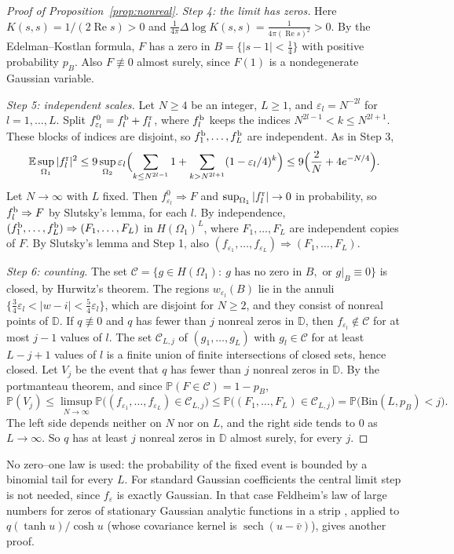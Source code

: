 \documentclass[11pt]{amsart}
\theoremstyle{definition}
\theoremstyle{remark}
\numberwithin{equation}{section}
\newcommand{\D}{\mathbb{D}}
\newcommand{\E}{\mathbb{E}}
\newcommand{\PP}{\mathbb{P}}
\newcommand{\eps}{\varepsilon}
\DeclareMathOperator{\re}{Re}
\DeclareMathOperator{\sech}{sech}
\begin{document}
\begin{proof}[Proof of Proposition~\ref{prop:nonreal}]
\emph{Step 4: the limit has zeros.} Here $K(s,s)=1/(2\re s)>0$ and $\frac1{4\pi}\Delta\log K(s,s)=\frac1{4\pi(\re s)^2}>0$. By the Edelman--Kostlan formula, $F$ has a zero in $B=\{|s-1|<\frac14\}$ with positive probability $p_B$. Also $F\not\equiv0$ almost surely, since $F(1)$ is a nondegenerate Gaussian variable.

\emph{Step 5: independent scales.} Let $N\ge4$ be an integer, $L\ge1$, and $\eps_l=N^{-2l}$ for $l=1,\dots,L$. Split $f^0_{\eps_l}=f^{\rm b}_l+f^{\rm r}_l$, where $f^{\rm b}_l$ keeps the indices $N^{2l-1}<k\le N^{2l+1}$. These blocks of indices are disjoint, so $f^{\rm b}_1,\dots,f^{\rm b}_L$ are independent. As in Step 3,
\[
\E\sup_{\Omega_1}|f^{\rm r}_l|^2\le9\sup_{\Omega_2}\eps_l\Bigl(\sum_{k\le N^{2l-1}}1+\sum_{k>N^{2l+1}}(1-\eps_l/4)^k\Bigr)\le9\Bigl(\frac2N+4e^{-N/4}\Bigr).
\]
Let $N\to\infty$ with $L$ fixed. Then $f^0_{\eps_l}\Rightarrow F$ and $\sup_{\Omega_1}|f^{\rm r}_l|\to0$ in probability, so $f^{\rm b}_l\Rightarrow F$ by Slutsky's lemma, for each $l$. By independence, $(f^{\rm b}_1,\dots,f^{\rm b}_L)\Rightarrow(F_1,\dots,F_L)$ in $H(\Omega_1)^L$, where $F_1,\dots,F_L$ are independent copies of $F$. By Slutsky's lemma and Step 1, also $(f_{\eps_1},\dots,f_{\eps_L})\Rightarrow(F_1,\dots,F_L)$.

\emph{Step 6: counting.} The set $\mathcal C=\{g\in H(\Omega_1):\ g\text{ has no zero in }B,\text{ or }g|_B\equiv0\}$ is closed, by Hurwitz's theorem. The regions $w_{\eps_l}(B)$ lie in the annuli $\{\frac34\eps_l<|w-i|<\frac54\eps_l\}$, which are disjoint for $N\ge2$, and they consist of nonreal points of $\D$. If $q\not\equiv0$ and $q$ has fewer than $j$ nonreal zeros in $\D$, then $f_{\eps_l}\notin\mathcal C$ for at most $j-1$ values of $l$. The set $\mathcal C_{L,j}$ of $(g_1,\dots,g_L)$ with $g_l\in\mathcal C$ for at least $L-j+1$ values of $l$ is a finite union of finite intersections of closed sets, hence closed. Let $V_j$ be the event that $q$ has fewer than $j$ nonreal zeros in $\D$. By the portmanteau theorem, and since $\PP(F\in\mathcal C)=1-p_B$,
\[
\PP(V_j)\le\limsup_{N\to\infty}\PP\bigl((f_{\eps_1},\dots,f_{\eps_L})\in\mathcal C_{L,j}\bigr)\le\PP\bigl((F_1,\dots,F_L)\in\mathcal C_{L,j}\bigr)=\PP\bigl(\mathrm{Bin}(L,p_B)<j\bigr).
\]
The left side depends neither on $N$ nor on $L$, and the right side tends to $0$ as $L\to\infty$. So $q$ has at least $j$ nonreal zeros in $\D$ almost surely, for every $j$.
\end{proof}

No zero--one law is used: the probability of the fixed event is bounded by a binomial tail for every $L$. For standard Gaussian coefficients the central limit step is not needed, since $f_\eps$ is exactly Gaussian. In that case Feldheim's law of large numbers for zeros of stationary Gaussian analytic functions in a strip \cite[Theorem~1]{Fe}, applied to $q(\tanh u)/\cosh u$ (whose covariance kernel is $\sech(u-\bar v)$), gives another proof.
\end{document}
